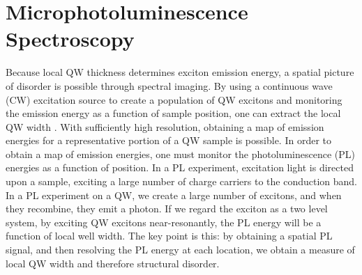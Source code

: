 \section{Microphotoluminescence Spectroscopy}
\indent Because local QW thickness determines exciton emission energy, a spatial picture of disorder is possible through spectral imaging. By using a continuous wave (CW) excitation source to create a population of QW excitons and monitoring the emission energy as a function of sample position, one can extract the local QW width \cite{bristowsep}. With sufficiently high resolution, obtaining a map of emission energies for a representative portion of a QW sample is possible. In order to obtain a map of emission energies, one must monitor the photoluminescence (PL) energies as a function of position. In a PL experiment, excitation light is directed upon a sample, exciting a large number of charge carriers to the conduction band. In a PL experiment on a QW, we create a large number of excitons, and when they recombine, they emit a photon. If we regard the exciton as a two level system, by exciting QW excitons near-resonantly, the PL energy will be a function of local well width. The key point is this: by obtaining a spatial PL signal, and then resolving the PL energy at each location, we obtain a measure of local QW width and therefore structural disorder.


